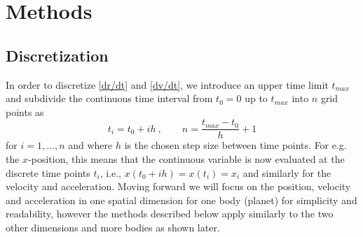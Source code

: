 \documentclass[12pt]{article}
\numberwithin{figure}{section}
\numberwithin{table}{section}
\begin{document}
\section{Methods} \label{sec:methods}


\subsection{Discretization}
In order to discretize \eqref{dr/dt} and \eqref{dv/dt}, we introduce an upper time limit $t_{max}$ and subdivide the continuous time interval from $t_0=0$ up to $t_{max}$ into $n$ grid points as
\begin{equation*}
	t_i=t_0+ih \ , \qquad n=\frac{t_{max}-t_0}{h}+1
\end{equation*}
for $i=1,...,n$ and where $h$ is the chosen step size between time points. For e.g. the $x$-position, this means that the continuous variable is now evaluated at the discrete time points $t_i$, i.e., $x(t_0+ih)=x(t_i)=x_i$ and similarly for the velocity and acceleration. Moving forward we will focus on the position, velocity and acceleration in one spatial dimension for one body (planet) for simplicity and readability, however the methods described below apply similarly to the two other dimensions and more bodies as shown later.\\
\end{document}
